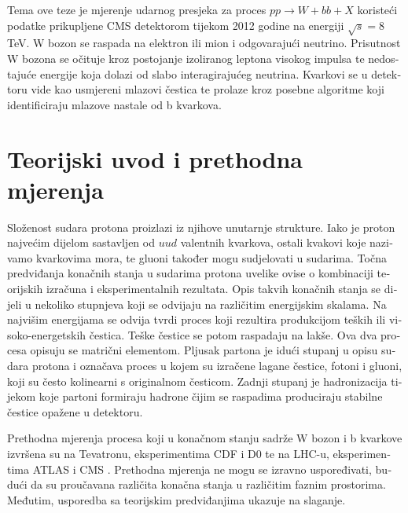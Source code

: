 \begin{otherlanguage}{croatian}
Tema ove teze je mjerenje udarnog presjeka za proces $pp\rightarrow W+bb+X$ koristeći podatke prikupljene CMS detektorom tijekom 2012 godine na energiji $\sqrt{s} = 8$ TeV. W bozon se raspada na elektron ili mion i odgovarajući neutrino. Prisutnost W bozona se očituje kroz postojanje izoliranog leptona visokog impulsa te nedostajuće energije koja dolazi od slabo interagirajućeg neutrina. Kvarkovi se u detektoru vide kao usmjereni mlazovi čestica te prolaze kroz posebne algoritme koji identificiraju mlazove nastale od b kvarkova.

\section{Teorijski uvod i prethodna mjerenja}

Složenost sudara protona proizlazi iz njihove unutarnje strukture. Iako je proton najvećim dijelom sastavljen od $uud$ valentnih kvarkova, ostali kvakovi koje nazivamo kvarkovima mora, te gluoni također mogu sudjelovati u sudarima. Točna predviđanja konačnih stanja u sudarima protona uvelike ovise o kombinaciji teorijskih izračuna i eksperimentalnih rezultata. Opis takvih konačnih stanja se dijeli u nekoliko stupnjeva koji se odvijaju na različitim energijskim skalama. Na najvišim energijama se odvija tvrdi proces koji rezultira produkcijom teških ili visoko-energetskih čestica. Teške čestice se potom raspadaju na lakše. Ova dva procesa opisuju se matrični elementom. Pljusak partona je idući stupanj u opisu sudara protona i označava proces u kojem su izračene lagane čestice, fotoni i gluoni, koji su često kolinearni s originalnom česticom. Zadnji stupanj je hadronizacija tijekom koje partoni formiraju hadrone čijim se raspadima produciraju stabilne čestice opažene u detektoru.
\par Prethodna mjerenja procesa koji u konačnom stanju sadrže W bozon i b kvarkove izvršena su na Tevatronu, eksperimentima CDF i D0 \cite{Aaltonen:2009qi,D0:2012qt} te na LHC-u, eksperimentima ATLAS i CMS \cite{Aad:2013vka,Chatrchyan:2013uza}. Prethodna mjerenja ne mogu se izravno uspoređivati, budući da su proučavana različita konačna stanja u različitim faznim prostorima. Međutim, usporedba sa teorijskim predviđanjima ukazuje na slaganje. 


\end{otherlanguage}
